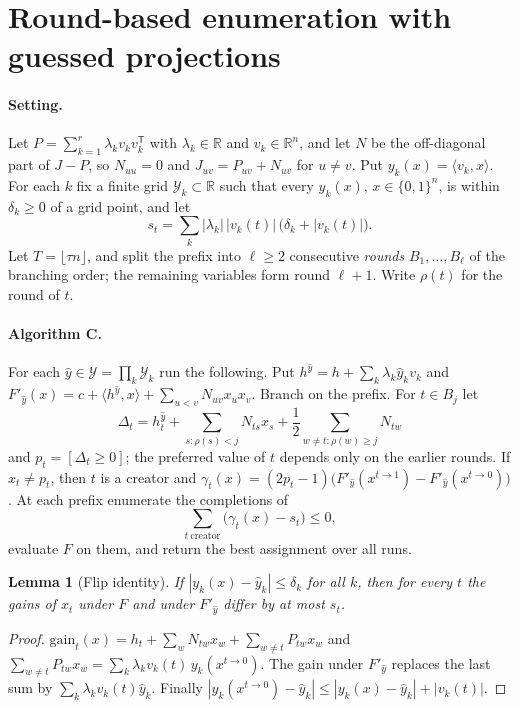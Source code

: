 \documentclass[11pt,a4paper]{article}
\newtheorem{lemma}[theorem]{Lemma}
\theoremstyle{definition}
\theoremstyle{remark}
\begin{document}
\section{Round-based enumeration with guessed projections}\label{sec:rounds}

\paragraph{Setting.} Let $P=\sum_{k=1}^r\lambda_kv_kv_k^{\mathsf T}$ with
$\lambda_k\in\mathbb R$ and $v_k\in\mathbb R^n$, and let $N$ be the off-diagonal
part of $J-P$, so $N_{uu}=0$ and $J_{uv}=P_{uv}+N_{uv}$ for $u\ne v$. Put
$y_k(x)=\langle v_k,x\rangle$. For each $k$ fix a finite grid
$\mathcal Y_k\subset\mathbb R$ such that every $y_k(x)$, $x\in\{0,1\}^n$, is within
$\delta_k\ge0$ of a grid point, and let
\[
 s_t=\sum_k|\lambda_k|\,|v_k(t)|\,\bigl(\delta_k+|v_k(t)|\bigr).
\]
Let $T=\lfloor\tau n\rfloor$, and split the prefix into $\ell\ge2$ consecutive
\emph{rounds} $B_1,\dots,B_\ell$ of the branching order; the remaining
variables form round $\ell+1$. Write $\rho(t)$ for the round of $t$.

\paragraph{Algorithm C.} For each $\hat y\in\mathcal Y=\prod_k\mathcal Y_k$ run
the following. Put $h^{\hat y}=h+\sum_k\lambda_k\hat y_kv_k$ and
$F'_{\hat y}(x)=c+\langle h^{\hat y},x\rangle+\sum_{u<v}N_{uv}x_ux_v$. Branch on
the prefix. For $t\in B_j$ let
\[
 \Delta_t=h^{\hat y}_t+\sum_{s:\rho(s)<j}N_{ts}x_s
          +\frac12\sum_{w\ne t:\rho(w)\ge j}N_{tw}
\]
and $p_t=[\Delta_t\ge0]$; the preferred value of $t$ depends only on the earlier
rounds. If $x_t\ne p_t$, then $t$ is a creator and
$\gamma_t(x)=(2p_t-1)\bigl(F'_{\hat y}(x^{t\to1})-F'_{\hat y}(x^{t\to0})\bigr)$.
At each prefix enumerate the completions of
\begin{equation}\label{eq:roundsum}
 \sum_{t\ \text{creator}}\bigl(\gamma_t(x)-s_t\bigr)\le0,
\end{equation}
evaluate $F$ on them, and return the best assignment over all runs.

\begin{lemma}[Flip identity]\label{lem:flip}
If $|y_k(x)-\hat y_k|\le\delta_k$ for all $k$, then for every $t$ the gains of
$x_t$ under $F$ and under $F'_{\hat y}$ differ by at most $s_t$.
\end{lemma}
\begin{proof}
$\mathrm{gain}_t(x)=h_t+\sum_wN_{tw}x_w+\sum_{w\ne t}P_{tw}x_w$ and
$\sum_{w\ne t}P_{tw}x_w=\sum_k\lambda_kv_k(t)\,y_k(x^{t\to0})$. The gain under
$F'_{\hat y}$ replaces the last sum by $\sum_k\lambda_kv_k(t)\hat y_k$. Finally
$|y_k(x^{t\to0})-\hat y_k|\le|y_k(x)-\hat y_k|+|v_k(t)|$.
\end{proof}
\end{document}
